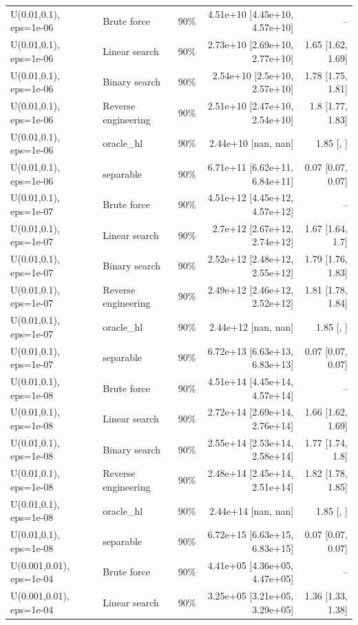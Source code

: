\begin{tabular}{llrrr}
U(0.01,0.1), eps=1e-06 & Brute force & 90\% & 4.51e+10 [4.45e+10, 4.57e+10] & -- \\
U(0.01,0.1), eps=1e-06 & Linear search & 90\% & 2.73e+10 [2.69e+10, 2.77e+10] & 1.65 [1.62, 1.69] \\
U(0.01,0.1), eps=1e-06 & Binary search & 90\% & 2.54e+10 [2.5e+10, 2.57e+10] & 1.78 [1.75, 1.81] \\
U(0.01,0.1), eps=1e-06 & Reverse engineering & 90\% & 2.51e+10 [2.47e+10, 2.54e+10] & 1.8 [1.77, 1.83] \\
U(0.01,0.1), eps=1e-06 & oracle_hl & 90\% & 2.44e+10 [nan, nan] & 1.85 [, ] \\
U(0.01,0.1), eps=1e-06 & separable & 90\% & 6.71e+11 [6.62e+11, 6.84e+11] & 0.07 [0.07, 0.07] \\
U(0.01,0.1), eps=1e-07 & Brute force & 90\% & 4.51e+12 [4.45e+12, 4.57e+12] & -- \\
U(0.01,0.1), eps=1e-07 & Linear search & 90\% & 2.7e+12 [2.67e+12, 2.74e+12] & 1.67 [1.64, 1.7] \\
U(0.01,0.1), eps=1e-07 & Binary search & 90\% & 2.52e+12 [2.48e+12, 2.55e+12] & 1.79 [1.76, 1.83] \\
U(0.01,0.1), eps=1e-07 & Reverse engineering & 90\% & 2.49e+12 [2.46e+12, 2.52e+12] & 1.81 [1.78, 1.84] \\
U(0.01,0.1), eps=1e-07 & oracle_hl & 90\% & 2.44e+12 [nan, nan] & 1.85 [, ] \\
U(0.01,0.1), eps=1e-07 & separable & 90\% & 6.72e+13 [6.63e+13, 6.83e+13] & 0.07 [0.07, 0.07] \\
U(0.01,0.1), eps=1e-08 & Brute force & 90\% & 4.51e+14 [4.45e+14, 4.57e+14] & -- \\
U(0.01,0.1), eps=1e-08 & Linear search & 90\% & 2.72e+14 [2.69e+14, 2.76e+14] & 1.66 [1.62, 1.69] \\
U(0.01,0.1), eps=1e-08 & Binary search & 90\% & 2.55e+14 [2.53e+14, 2.58e+14] & 1.77 [1.74, 1.8] \\
U(0.01,0.1), eps=1e-08 & Reverse engineering & 90\% & 2.48e+14 [2.45e+14, 2.51e+14] & 1.82 [1.78, 1.85] \\
U(0.01,0.1), eps=1e-08 & oracle_hl & 90\% & 2.44e+14 [nan, nan] & 1.85 [, ] \\
U(0.01,0.1), eps=1e-08 & separable & 90\% & 6.72e+15 [6.63e+15, 6.83e+15] & 0.07 [0.07, 0.07] \\
U(0.001,0.01), eps=1e-04 & Brute force & 90\% & 4.41e+05 [4.36e+05, 4.47e+05] & -- \\
U(0.001,0.01), eps=1e-04 & Linear search & 90\% & 3.25e+05 [3.21e+05, 3.29e+05] & 1.36 [1.33, 1.38] \\

\end{tabular}
